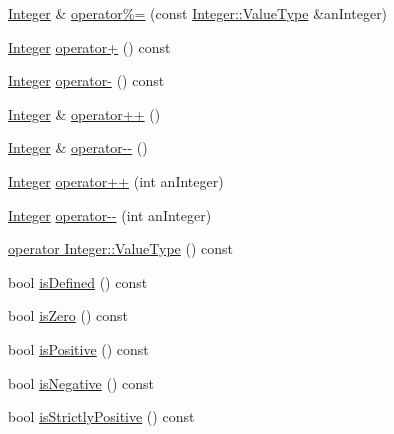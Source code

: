 \begin{DoxyCompactItemize}
\item 
\hyperlink{classlibrary_1_1core_1_1types_1_1_integer}{Integer} \& \hyperlink{classlibrary_1_1core_1_1types_1_1_integer_a88482e4677001d7d523f90ef28ac95f6}{operator\%=} (const \hyperlink{classlibrary_1_1core_1_1types_1_1_integer_a623afb1580f870fd8a1997b1c12c917d}{Integer\+::\+Value\+Type} \&an\+Integer)
\item 
\hyperlink{classlibrary_1_1core_1_1types_1_1_integer}{Integer} \hyperlink{classlibrary_1_1core_1_1types_1_1_integer_adaf665cd81d9befd1f764e11c2be9b69}{operator+} () const
\item 
\hyperlink{classlibrary_1_1core_1_1types_1_1_integer}{Integer} \hyperlink{classlibrary_1_1core_1_1types_1_1_integer_ad9670b50ae46bc0f09e4995e445dab99}{operator-\/} () const
\item 
\hyperlink{classlibrary_1_1core_1_1types_1_1_integer}{Integer} \& \hyperlink{classlibrary_1_1core_1_1types_1_1_integer_a5b6a30696dcea44bcf29e4bd0a01f490}{operator++} ()
\item 
\hyperlink{classlibrary_1_1core_1_1types_1_1_integer}{Integer} \& \hyperlink{classlibrary_1_1core_1_1types_1_1_integer_aa57a45cc369f42e8a5f98391e26b6549}{operator-\/-\/} ()
\item 
\hyperlink{classlibrary_1_1core_1_1types_1_1_integer}{Integer} \hyperlink{classlibrary_1_1core_1_1types_1_1_integer_a10dd68fe912b11ba68840f9c1fdb6ffa}{operator++} (int an\+Integer)
\item 
\hyperlink{classlibrary_1_1core_1_1types_1_1_integer}{Integer} \hyperlink{classlibrary_1_1core_1_1types_1_1_integer_ad8889e78cffb5b540d2f69d36d36e049}{operator-\/-\/} (int an\+Integer)
\item 
\hyperlink{classlibrary_1_1core_1_1types_1_1_integer_ad1cf430796727e18440d50d4764b2792}{operator Integer\+::\+Value\+Type} () const
\item 
bool \hyperlink{classlibrary_1_1core_1_1types_1_1_integer_a5edecf8abe00a8de9e021b8cc2b38c25}{is\+Defined} () const
\item 
bool \hyperlink{classlibrary_1_1core_1_1types_1_1_integer_a9b3f0fac0463a8863c46a69f14a91d15}{is\+Zero} () const
\item 
bool \hyperlink{classlibrary_1_1core_1_1types_1_1_integer_a78058bede904b0b730e6a0924296bae5}{is\+Positive} () const
\item 
bool \hyperlink{classlibrary_1_1core_1_1types_1_1_integer_a7fbd4836c6a0f0eab96689dc20e39118}{is\+Negative} () const
\item 
bool \hyperlink{classlibrary_1_1core_1_1types_1_1_integer_a45cbf113ae4656add845025e5ee6b61a}{is\+Strictly\+Positive} () const

\end{DoxyCompactItemize}
